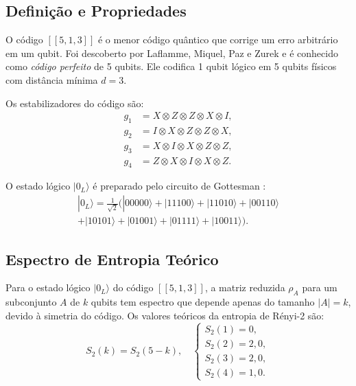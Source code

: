 \documentclass[12pt,a4paper,oneside]{book}
\theoremstyle{definition}
\theoremstyle{remark}
\begin{document}
\subsection{Definição e Propriedades}

O código $[[5,1,3]]$ é o menor código quântico que corrige um erro arbitrário em um qubit. Foi descoberto por Laflamme, Miquel, Paz e Zurek \cite{laflamme1996perfect} e é conhecido como \textit{código perfeito} de 5 qubits. Ele codifica 1 qubit lógico em 5 qubits físicos com distância mínima $d = 3$.

Os estabilizadores do código são:
\begin{align}
    g_1 &= X \otimes Z \otimes Z \otimes X \otimes I, \\
    g_2 &= I \otimes X \otimes Z \otimes Z \otimes X, \\
    g_3 &= X \otimes I \otimes X \otimes Z \otimes Z, \\
    g_4 &= Z \otimes X \otimes I \otimes X \otimes Z.
\end{align}

O estado lógico $|0_L\rangle$ é preparado pelo circuito de Gottesman \cite{gottesman1997stabilizer}:
\begin{align}
    |0_L\rangle = \frac{1}{\sqrt{2}}\bigl(|00000\rangle + |11100\rangle + |11010\rangle + |00110\rangle \\
    + |10101\rangle + |01001\rangle + |01111\rangle + |10011\rangle\bigr).
\end{align}

\subsection{Espectro de Entropia Teórico}

Para o estado lógico $|0_L\rangle$ do código $[[5,1,3]]$, a matriz reduzida $\rho_A$ para um subconjunto $A$ de $k$ qubits tem espectro que depende apenas do tamanho $|A| = k$, devido à simetria do código. Os valores teóricos da entropia de Rényi-2 são:
\begin{equation}\label{eq:theoretical_spectrum}
    S_2(k) = S_2(5-k), \quad
    \begin{cases}
        S_2(1) = 0, \\
        S_2(2) = 2{,}0, \\
        S_2(3) = 2{,}0, \\
        S_2(4) = 1{,}0.
    \end{cases}
\end{equation}
\end{document}
